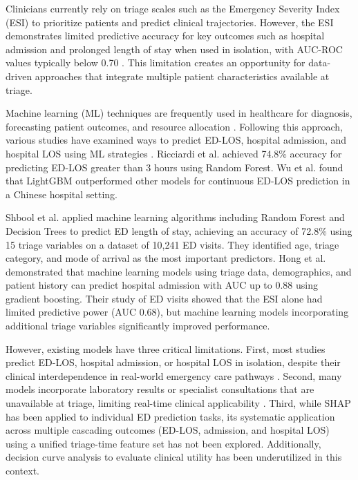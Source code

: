 \documentclass[harvard,article]{frontiersinFPHY_FAMS}
\begin{document}
Clinicians currently rely on triage scales such as the Emergency Severity Index (ESI) to prioritize patients and predict clinical trajectories. However, the ESI demonstrates limited predictive accuracy for key outcomes such as hospital admission and prolonged length of stay when used in isolation, with AUC-ROC values typically below 0.70 \cite{levin2020}. This limitation creates an opportunity for data-driven approaches that integrate multiple patient characteristics available at triage.

Machine learning (ML) techniques are frequently used in healthcare for diagnosis, forecasting patient outcomes, and resource allocation \cite{kareemi2020, raita2019, taylor2020}. Following this approach, various studies have examined ways to predict ED-LOS, hospital admission, and hospital LOS using ML strategies \cite{wu2025, fenn2021, lin2024, wu2023}. Ricciardi et al. \cite{ricciardi2024} achieved 74.8\% accuracy for predicting ED-LOS greater than 3 hours using Random Forest. Wu et al. \cite{wu2025} found that LightGBM outperformed other models for continuous ED-LOS prediction in a Chinese hospital setting.

Shbool et al. \cite{shbool2023} applied machine learning algorithms including Random Forest and Decision Trees to predict ED length of stay, achieving an accuracy of 72.8\% using 15 triage variables on a dataset of 10,241 ED visits. They identified age, triage category, and mode of arrival as the most important predictors. Hong et al. \cite{hong2018} demonstrated that machine learning models using triage data, demographics, and patient history can predict hospital admission with AUC up to 0.88 using gradient boosting. Their study of ED visits showed that the ESI alone had limited predictive power (AUC 0.68), but machine learning models incorporating additional triage variables significantly improved performance.

However, existing models have three critical limitations. First, most studies predict ED-LOS, hospital admission, or hospital LOS in isolation, despite their clinical interdependence in real-world emergency care pathways \cite{stone2022}. Second, many models incorporate laboratory results or specialist consultations that are unavailable at triage, limiting real-time clinical applicability \cite{levin2020, xiao2023}. Third, while SHAP has been applied to individual ED prediction tasks, its systematic application across multiple cascading outcomes (ED-LOS, admission, and hospital LOS) using a unified triage-time feature set has not been explored. Additionally, decision curve analysis to evaluate clinical utility has been underutilized in this context.
\end{document}
